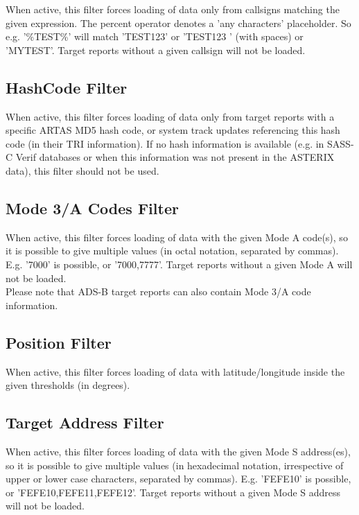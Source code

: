 When active, this filter forces loading of data only from callsigns matching the given expression. The percent operator denotes a 'any characters' placeholder. So e.g. '\%TEST\%' will match 'TEST123' or 'TEST123   ' (with spaces) or 'MYTEST'. Target reports without a given callsign will not be loaded.

\subsection{HashCode Filter}

When active, this filter forces loading of data only from target reports with a specific ARTAS MD5 hash code, or system track updates referencing this hash code (in their TRI information). If no hash information is available (e.g. in SASS-C Verif databases or when this information was not present in the ASTERIX data), this filter should not be used.

\subsection{Mode 3/A Codes Filter}

When active, this filter forces loading of data with the given Mode A code(s), so it is possible to give multiple values (in octal notation, separated by commas). E.g. '7000' is possible, or '7000,7777'. Target reports without a given Mode A will not be loaded. \\

Please note that ADS-B target reports can also contain Mode 3/A code information.

\subsection{Position Filter}

When active, this filter forces loading of data with latitude/longitude inside the given thresholds (in degrees).

\subsection{Target Address Filter}

When active, this filter forces loading of data with the given Mode S address(es), so it is possible to give multiple values (in hexadecimal notation, irrespective of upper or lower case characters, separated by commas). E.g. 'FEFE10' is possible, or 'FEFE10,FEFE11,FEFE12'. Target reports without a given Mode S address will not be loaded.


